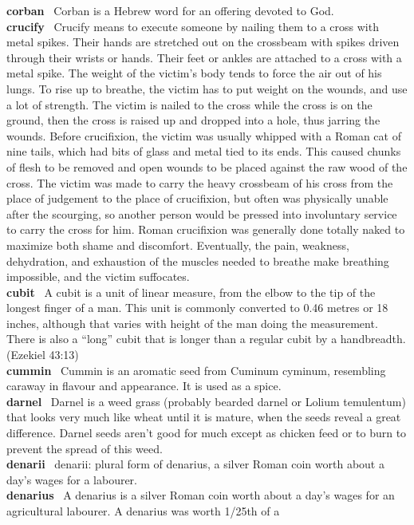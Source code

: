 \textbf{corban}~ Corban is a Hebrew word for an offering devoted to
God.\\
\textbf{crucify}~ Crucify means to execute someone by nailing them to a
cross with metal spikes. Their hands are stretched out on the crossbeam
with spikes driven through their wrists or hands. Their feet or ankles
are attached to a cross with a metal spike. The weight of the victim's
body tends to force the air out of his lungs. To rise up to breathe, the
victim has to put weight on the wounds, and use a lot of strength. The
victim is nailed to the cross while the cross is on the ground, then the
cross is raised up and dropped into a hole, thus jarring the wounds.
Before crucifixion, the victim was usually whipped with a Roman cat of
nine tails, which had bits of glass and metal tied to its ends. This
caused chunks of flesh to be removed and open wounds to be placed
against the raw wood of the cross. The victim was made to carry the
heavy crossbeam of his cross from the place of judgement to the place of
crucifixion, but often was physically unable after the scourging, so
another person would be pressed into involuntary service to carry the
cross for him. Roman crucifixion was generally done totally naked to
maximize both shame and discomfort. Eventually, the pain, weakness,
dehydration, and exhaustion of the muscles needed to breathe make
breathing impossible, and the victim suffocates.\\
\textbf{cubit}~ A cubit is a unit of linear measure, from the elbow to
the tip of the longest finger of a man. This unit is commonly converted
to 0.46 metres or 18 inches, although that varies with height of the man
doing the measurement. There is also a ``long'' cubit that is longer
than a regular cubit by a handbreadth. (Ezekiel 43:13)\\
\textbf{cummin}~ Cummin is an aromatic seed from Cuminum cyminum,
resembling caraway in flavour and appearance. It is used as a spice.\\
\textbf{darnel}~ Darnel is a weed grass (probably bearded darnel or
Lolium temulentum) that looks very much like wheat until it is mature,
when the seeds reveal a great difference. Darnel seeds aren't good for
much except as chicken feed or to burn to prevent the spread of this
weed.\\
\textbf{denarii}~ denarii: plural form of denarius, a silver Roman coin
worth about a day's wages for a labourer.\\
\textbf{denarius}~ A denarius is a silver Roman coin worth about a day's
wages for an agricultural labourer. A denarius was worth 1/25th of a

